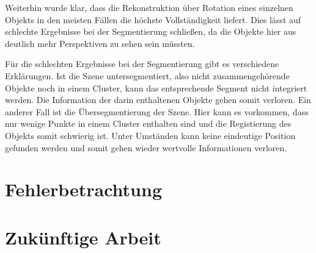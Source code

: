 Weiterhin wurde klar, dass die Rekonstruktion über Rotation eines einzelnen Objekts in den meisten Fällen die höchste Vollständigkeit liefert.
Dies lässt auf schlechte Ergebnisse bei der Segmentierung schließen, da die Objekte hier aus deutlich mehr Perspektiven zu sehen sein müssten.

Für die schlechten Ergebnisse bei der Segmentierung gibt es verschiedene Erklärungen.
Ist die Szene untersegmentiert, also nicht zusammengehörende Objekte noch in einem Cluster, kann das entsprechende Segment nicht integriert werden.
Die Information der darin enthaltenen Objekte gehen somit verloren.
Ein anderer Fall ist die Übersegmentierung der Szene.
Hier kann es vorkommen, dass nur wenige Punkte in einem Cluster enthalten sind und die Registierung des Objekts somit schwierig ist.
Unter Umständen kann keine eindeutige Position gefunden werden und somit gehen wieder wertvolle Informationen verloren.



\section{Fehlerbetrachtung}
\label{sec:auswertung-fehler}



\section{Zukünftige Arbeit}
\label{sec:auswertung-zukunft}

\cite{kazhdan2020poisson}
